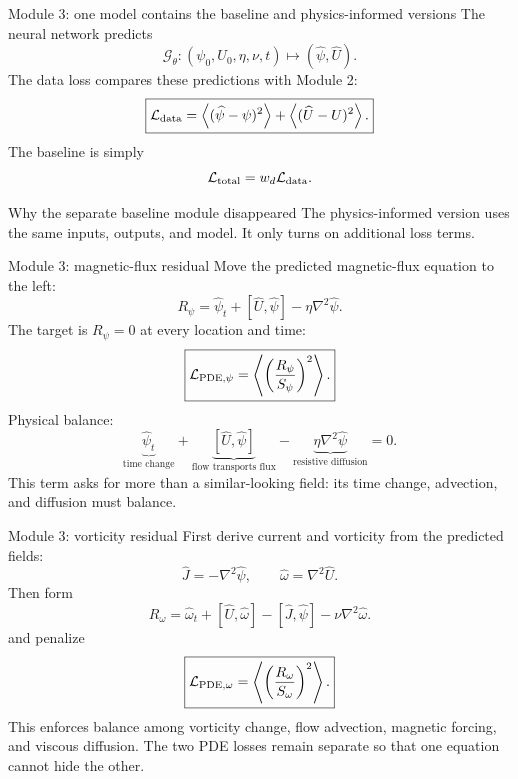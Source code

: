 \documentclass[aspectratio=169,11pt]{beamer}
\newcommand{\bracket}[2]{\left[#1,#2\right]}
\newcommand{\avg}[1]{\left\langle #1\right\rangle}
\newcommand{\Rpsi}{R_{\psi}}
\newcommand{\Romega}{R_{\omega}}
\newcommand{\currentmodule}{Module 1}
\newcommand{\moduleprogress}{1 of 4}
\newcommand{\setmodule}[2]{%
  \renewcommand{\currentmodule}{#1}%
  \renewcommand{\moduleprogress}{#2}%
}
\begin{document}

\setmodule{Module 3}{1 of 5}
\begin{frame}[t]{Module 3: one model contains the baseline and physics-informed versions}
\vspace{-0.15em}
The neural network predicts
\[
\mathcal G_\theta:(\psi_0,U_0,\eta,\nu,t)
\longmapsto(\widehat\psi,\widehat U).
\]
The data loss compares these predictions with Module 2:
\[
\boxed{
\mathcal L_{\rm data}
=\avg{(\widehat\psi-\psi)^2}
+\avg{(\widehat U-U)^2}.
}
\]
The baseline is simply
\[
\mathcal L_{\rm total}=w_d\mathcal L_{\rm data}.
\]

\begin{block}{Why the separate baseline module disappeared}
The physics-informed version uses the same inputs, outputs, and model. It only turns on additional loss terms.
\end{block}
\end{frame}

\setmodule{Module 3}{2 of 5}
\begin{frame}[t]{Module 3: magnetic-flux residual}
\vspace{-0.15em}
Move the predicted magnetic-flux equation to the left:
\[
\boxed{
\Rpsi
=\widehat\psi_t
+\bracket{\widehat U}{\widehat\psi}
-\eta\nabla^2\widehat\psi.
}
\]
The target is $\Rpsi=0$ at every location and time:
\[
\boxed{
\mathcal L_{{\rm PDE},\psi}
=\avg{\left(\frac{\Rpsi}{S_\psi}\right)^2}.
}
\]
Physical balance:
\[
\underbrace{\widehat\psi_t}_{\text{time change}}
+\underbrace{\bracket{\widehat U}{\widehat\psi}}_{\text{flow transports flux}}
-\underbrace{\eta\nabla^2\widehat\psi}_{\text{resistive diffusion}}
=0.
\]
This term asks for more than a similar-looking field: its time change, advection, and diffusion must balance.
\end{frame}

\setmodule{Module 3}{3 of 5}
\begin{frame}[t]{Module 3: vorticity residual}
\vspace{-0.15em}
First derive current and vorticity from the predicted fields:
\[
\widehat J=-\nabla^2\widehat\psi,
\qquad
\widehat\omega=\nabla^2\widehat U.
\]
Then form
\[
\boxed{
\Romega
=\widehat\omega_t
+\bracket{\widehat U}{\widehat\omega}
-\bracket{\widehat J}{\widehat\psi}
-\nu\nabla^2\widehat\omega.
}
\]
and penalize
\[
\boxed{
\mathcal L_{{\rm PDE},\omega}
=\avg{\left(\frac{\Romega}{S_\omega}\right)^2}.
}
\]
This enforces balance among vorticity change, flow advection, magnetic forcing, and viscous diffusion. The two PDE losses remain separate so that one equation cannot hide the other.
\end{frame}
\end{document}
